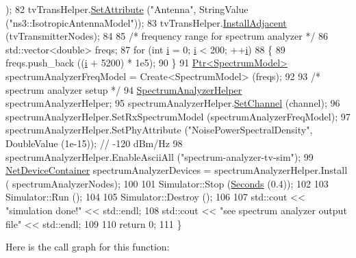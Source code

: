 \begin{DoxyCode}
      );
82   tvTransHelper.\hyperlink{classns3_1_1TvSpectrumTransmitterHelper_af602e03cad3ae4cabafcb127c888fb53}{SetAttribute} (\textcolor{stringliteral}{"Antenna"}, StringValue (\textcolor{stringliteral}{"ns3::IsotropicAntennaModel"}));
83   tvTransHelper.\hyperlink{classns3_1_1TvSpectrumTransmitterHelper_a671aa2a952822ecf3a74db1e7f643541}{InstallAdjacent} (tvTransmitterNodes);
84 
85   \textcolor{comment}{/* frequency range for spectrum analyzer */}
86   std::vector<double> freqs;
87   \textcolor{keywordflow}{for} (\textcolor{keywordtype}{int} \hyperlink{bernuolliDistribution_8m_a6f6ccfcf58b31cb6412107d9d5281426}{i} = 0; \hyperlink{bernuolliDistribution_8m_a6f6ccfcf58b31cb6412107d9d5281426}{i} < 200; ++\hyperlink{bernuolliDistribution_8m_a6f6ccfcf58b31cb6412107d9d5281426}{i})
88     \{
89       freqs.push\_back ((\hyperlink{bernuolliDistribution_8m_a6f6ccfcf58b31cb6412107d9d5281426}{i} + 5200) * 1e5);
90     \}
91   \hyperlink{classns3_1_1Ptr}{Ptr<SpectrumModel>} spectrumAnalyzerFreqModel = Create<SpectrumModel> (freqs);
92 
93   \textcolor{comment}{/* spectrum analyzer setup */}
94   \hyperlink{classns3_1_1SpectrumAnalyzerHelper}{SpectrumAnalyzerHelper} spectrumAnalyzerHelper;
95   spectrumAnalyzerHelper.\hyperlink{classns3_1_1SpectrumAnalyzerHelper_a7fb7b79c0706c9aecd427af6c4148031}{SetChannel} (channel);
96   spectrumAnalyzerHelper.SetRxSpectrumModel (spectrumAnalyzerFreqModel);
97   spectrumAnalyzerHelper.SetPhyAttribute (\textcolor{stringliteral}{"NoisePowerSpectralDensity"}, DoubleValue (1e-15)); \textcolor{comment}{// -120 dBm/Hz}
98   spectrumAnalyzerHelper.EnableAsciiAll (\textcolor{stringliteral}{"spectrum-analyzer-tv-sim"});
99   \hyperlink{classns3_1_1NetDeviceContainer}{NetDeviceContainer} spectrumAnalyzerDevices = spectrumAnalyzerHelper.Install (
      spectrumAnalyzerNodes);
100 
101   Simulator::Stop (\hyperlink{group__timecivil_ga33c34b816f8ff6628e33d5c8e9713b9e}{Seconds} (0.4));
102 
103   Simulator::Run ();
104 
105   Simulator::Destroy ();
106 
107   std::cout << \textcolor{stringliteral}{"simulation done!"} << std::endl;
108   std::cout << \textcolor{stringliteral}{"see spectrum analyzer output file"} << std::endl;
109 
110   \textcolor{keywordflow}{return} 0;
111 \}
\end{DoxyCode}


Here is the call graph for this function\+:


